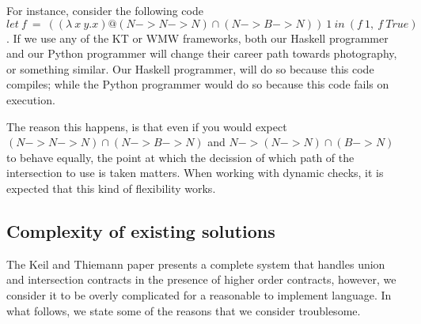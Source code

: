 For instance, consider the following code
$let~f~=~((\lambda~x~y.x)@(N -> N -> N) \cap (N -> B -> N))~1~in~(f~1,~f~True)$.
If we use any of the KT or WMW frameworks, both our Haskell programmer and our
Python programmer will change their career path towards photography, or something
similar.
Our Haskell programmer, will do so because this code compiles;
while the Python programmer would do so because this code fails on execution.

The reason this happens, is that even if you would expect
$(N -> N -> N) \cap (N -> B -> N)$
and $N -> (N -> N) \cap (B -> N)$ to behave equally, the point at which
the decission of which path of the intersection to use is taken
matters.
When working with dynamic checks, it is expected that this kind of
flexibility works.



\subsection{Complexity of existing solutions}

The Keil and Thiemann paper presents a complete system that handles union and intersection
contracts in the presence of higher order contracts, however, we consider it to be overly
complicated for a reasonable to implement language.
In what follows, we state some of the reasons that we consider troublesome.




